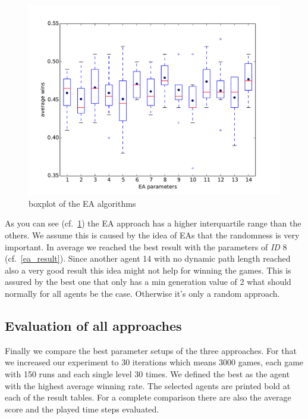 \begin{figure}[H]
\centering
\includegraphics[scale=0.5]{images/eval_evolutionary.pdf}
\caption{boxplot of the \ac{EA} algorithms}
\label{fig:eval_evo}
\end{figure}

\vspace{-0.5cm}
As you can see (cf.~\cref{fig:eval_evo}) the \ac{EA} approach has a higher
interquartile range than the others.
We assume this is caused by the idea of \acp{EA} that the randomness is very important.
In average we reached the best result with the parameters of \textit{ID} 8 (cf.~\cref{ea_result}). 
Since another agent 14 with no dynamic path length reached also a very good result this idea might
not help for winning the games. This is assured by the best one that only has a min generation value 
of 2 what should normally for all agents be the case. Otherwise it's only a random approach.




\subsection{Evaluation of all approaches} 


Finally we compare the best parameter setups of the three approaches. 
For that we increased our experiment to 30 iterations which means 3000 games, each game
with 150 runs and each single level 30 times.
We defined the best as the agent with the highest average winning rate.
The selected agents are printed bold at each of the result tables.
For a complete comparison there are also the average score and the played time steps evaluated.


